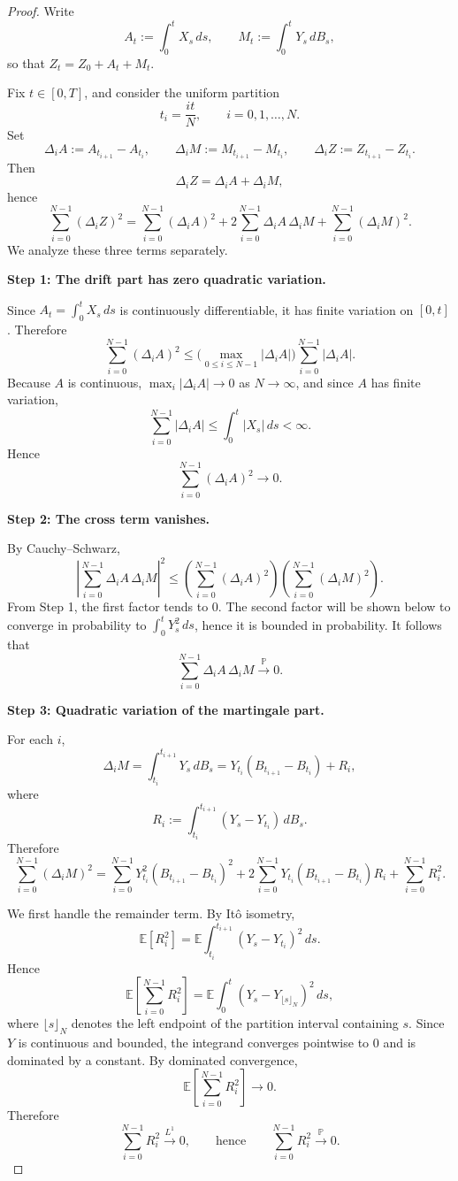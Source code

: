 \documentclass[11pt]{article}
\theoremstyle{definition}
\begin{document}
\begin{proof}
Write
\[
A_t:=\int_0^t X_s\,ds,
\qquad
M_t:=\int_0^t Y_s\,dB_s,
\]
so that \(Z_t=Z_0+A_t+M_t\).

Fix \(t\in[0,T]\), and consider the uniform partition
\[
t_i=\frac{it}{N},\qquad i=0,1,\dots,N.
\]
Set
\[
\Delta_i A:=A_{t_{i+1}}-A_{t_i},
\qquad
\Delta_i M:=M_{t_{i+1}}-M_{t_i},
\qquad
\Delta_i Z:=Z_{t_{i+1}}-Z_{t_i}.
\]
Then
\[
\Delta_i Z=\Delta_i A+\Delta_i M,
\]
hence
\[
\sum_{i=0}^{N-1}(\Delta_i Z)^2
=
\sum_{i=0}^{N-1}(\Delta_i A)^2
+
2\sum_{i=0}^{N-1}\Delta_i A\,\Delta_i M
+
\sum_{i=0}^{N-1}(\Delta_i M)^2.
\]
We analyze these three terms separately.

\medskip
\noindent
\textbf{Step 1: The drift part has zero quadratic variation.}

Since \(A_t=\int_0^t X_s\,ds\) is continuously differentiable, it has finite variation on \([0,t]\). Therefore
\[
\sum_{i=0}^{N-1}(\Delta_i A)^2
\le
\Big(\max_{0\le i\le N-1}|\Delta_i A|\Big)\sum_{i=0}^{N-1}|\Delta_i A|.
\]
Because \(A\) is continuous, \(\max_i |\Delta_i A|\to 0\) as \(N\to\infty\), and since \(A\) has finite variation,
\[
\sum_{i=0}^{N-1}|\Delta_i A|
\le
\int_0^t |X_s|\,ds <\infty.
\]
Hence
\[
\sum_{i=0}^{N-1}(\Delta_i A)^2 \to 0.
\]

\medskip
\noindent
\textbf{Step 2: The cross term vanishes.}

By Cauchy--Schwarz,
\[
\left|\sum_{i=0}^{N-1}\Delta_i A\,\Delta_i M\right|^2
\le
\left(\sum_{i=0}^{N-1}(\Delta_i A)^2\right)
\left(\sum_{i=0}^{N-1}(\Delta_i M)^2\right).
\]
From Step 1, the first factor tends to \(0\). The second factor will be shown below to converge in probability to \(\int_0^t Y_s^2\,ds\), hence it is bounded in probability. It follows that
\[
\sum_{i=0}^{N-1}\Delta_i A\,\Delta_i M \xrightarrow{\mathbb P} 0.
\]

\medskip
\noindent
\textbf{Step 3: Quadratic variation of the martingale part.}

For each \(i\),
\[
\Delta_i M
=
\int_{t_i}^{t_{i+1}} Y_s\,dB_s
=
Y_{t_i}(B_{t_{i+1}}-B_{t_i})+R_i,
\]
where
\[
R_i:=\int_{t_i}^{t_{i+1}}(Y_s-Y_{t_i})\,dB_s.
\]
Therefore
\[
\sum_{i=0}^{N-1}(\Delta_i M)^2
=
\sum_{i=0}^{N-1}Y_{t_i}^2(B_{t_{i+1}}-B_{t_i})^2
+
2\sum_{i=0}^{N-1}Y_{t_i}(B_{t_{i+1}}-B_{t_i})R_i
+
\sum_{i=0}^{N-1}R_i^2.
\]

We first handle the remainder term. By It\^o isometry,
\[
\mathbb E[R_i^2]
=
\mathbb E\int_{t_i}^{t_{i+1}}(Y_s-Y_{t_i})^2\,ds.
\]
Hence
\[
\mathbb E\left[\sum_{i=0}^{N-1}R_i^2\right]
=
\mathbb E\int_0^t (Y_s-Y_{\lfloor s\rfloor_N})^2\,ds,
\]
where \(\lfloor s\rfloor_N\) denotes the left endpoint of the partition interval containing \(s\).
Since \(Y\) is continuous and bounded, the integrand converges pointwise to \(0\) and is dominated by a constant. By dominated convergence,
\[
\mathbb E\left[\sum_{i=0}^{N-1}R_i^2\right]\to 0.
\]
Therefore
\[
\sum_{i=0}^{N-1}R_i^2 \xrightarrow{L^1} 0,
\qquad\text{hence}\qquad
\sum_{i=0}^{N-1}R_i^2 \xrightarrow{\mathbb P} 0.
\]


\end{proof}
\end{document}
